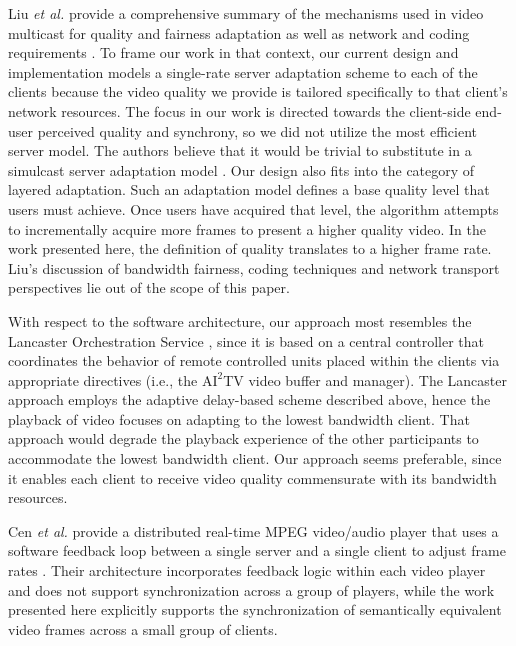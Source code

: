\documentclass{sig-alternate}
\begin{document}

Liu {\it et al.} provide a comprehensive summary of the mechanisms
used in video multicast for quality and fairness adaptation as well as
network and coding requirements \cite{LIU}.  To frame our work in that
context, our current design and implementation models a single-rate
server adaptation scheme to each of the clients because the video
quality we provide is tailored specifically to that client's network
resources.  The focus in our work is directed towards the client-side
end-user perceived quality and synchrony, so we did not utilize the
most efficient server model.  The authors believe that it would be
trivial to substitute in a simulcast server adaptation model
\cite{CHEUNG,LI}.  Our design also fits into the category of layered
adaptation.  Such an adaptation model defines a base quality level
that users must achieve.  Once users have acquired that level, the
algorithm attempts to incrementally acquire more frames to present a
higher quality video.  In the work presented here, the definition of
quality translates to a higher frame rate.  Liu's discussion of
bandwidth fairness, coding techniques and network transport
perspectives lie out of the scope of this paper.

With respect to the software architecture, our approach most resembles
the Lancaster Orchestration Service \cite{Lancaster}, since it is
based on a central controller that coordinates the behavior of remote
controlled units placed within the clients via appropriate directives
(i.e., the $\mathrm{AI}^2$TV video buffer and manager).  The Lancaster
approach employs the adaptive delay-based scheme described above,
hence the playback of video focuses on adapting to the lowest
bandwidth client.  That approach would degrade the playback experience
of the other participants to accommodate the lowest bandwidth client.
Our approach seems preferable, since it enables each client to receive
video quality commensurate with its bandwidth resources.

Cen {\it et al.} provide a distributed real-time MPEG video/audio
player that uses a software feedback loop between a single server and
a single client to adjust frame rates \cite{CEN}.  Their architecture
incorporates feedback logic within each video player and does not
support synchronization across a group of players, while the work
presented here explicitly supports the synchronization of semantically
equivalent video frames across a small group of clients.
\end{document}
